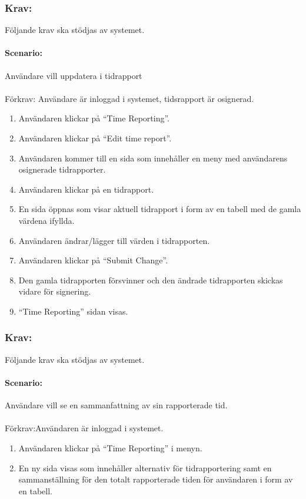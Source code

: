 \documentclass[paper=a4, fontsize=11pt,twoside]{article}
\begin{document}
\subsubsection{Krav:} Följande krav ska stödjas av systemet.
\paragraph{Scenario:}Användare vill uppdatera i tidrapport
\paragraph{}
Förkrav: Användare är inloggad i systemet, tidsrapport är osignerad.
 \begin{enumerate}
 \item Användaren klickar på “Time Reporting”.
 \item	Användaren klickar på “Edit time report”.
 \item	Användaren kommer till en sida som innehåller en meny med användarens osignerade tidrapporter.
 \item 	Användaren klickar på en tidrapport.
 \item	En sida öppnas som visar aktuell tidrapport i form av en tabell med de gamla värdena ifyllda.
 \item	Användaren ändrar/lägger till värden i tidrapporten.
 \item	Användaren klickar på “Submit Change”.
 \item	Den gamla tidrapporten försvinner och den ändrade tidrapporten skickas vidare för signering.
 \item	“Time Reporting” sidan visas.
 	
 \end{enumerate}
 \subsubsection{Krav:}Följande krav ska stödjas av systemet.
 \paragraph{Scenario:}Användare vill se en sammanfattning av sin rapporterade tid.
 \paragraph{}
 Förkrav:Användaren är inloggad i systemet.
 \begin{enumerate}
\item  Användaren klickar på “Time Reporting” i menyn.
\item  En ny sida visas som innehåller alternativ för tidrapportering samt en sammanställning för den totalt rapporterade tiden för användaren i form av en tabell.

 \end{enumerate}
\end{document}
